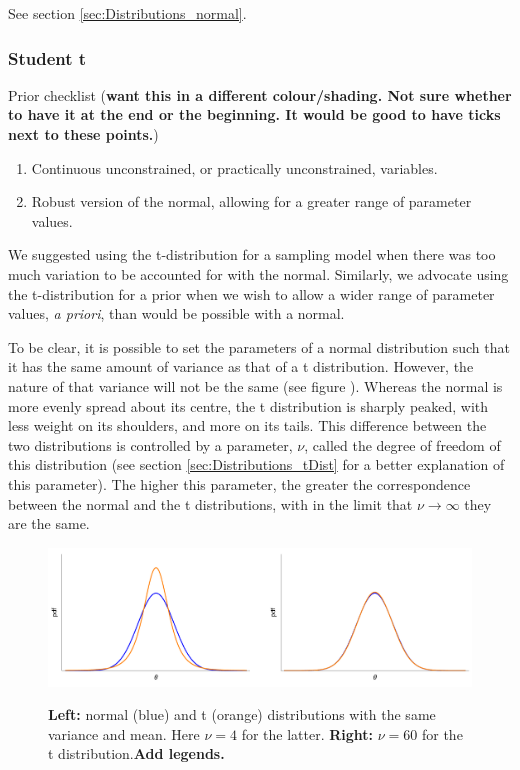 \documentclass[11pt,fullpage]{book}
\begin{document}
See section \ref{sec:Distributions_normal}.



\subsubsection{Student t}
Prior checklist (\textbf{want this in a different colour/shading. Not sure whether to have it at the end or the beginning. It would be good to have ticks next to these points.})

\begin{enumerate} 
\item Continuous unconstrained, or practically unconstrained, variables.
\item Robust version of the normal, allowing for a greater range of parameter values.
\end{enumerate}

We suggested using the t-distribution for a sampling model when there was too much variation to be accounted for with the normal. Similarly, we advocate using the t-distribution for a prior when we wish to allow a wider range of parameter values, \textit{a priori}, than would be possible with a normal.

To be clear, it is possible to set the parameters of a normal distribution such that it has the same amount of variance as that of a t distribution. However, the nature of that variance will not be the same (see figure ). Whereas the normal is more evenly spread about its centre, the t distribution is sharply peaked, with less weight on its shoulders, and more on its tails. This difference between the two distributions is controlled by a parameter, $\nu$, called the degree of freedom of this distribution (see section \ref{sec:Distributions_tDist} for a better explanation of this parameter). The higher this parameter, the greater the correspondence between the normal and the t distributions, with in the limit that $\nu\rightarrow\infty$ they are the same.

\begin{figure}
\centering
\scalebox{0.5} 
{\includegraphics{Distributions_normalTPrior.pdf}}
\caption{\textbf{Left:} normal (blue) and t (orange) distributions with the same variance and mean. Here $\nu=4$ for the latter. \textbf{Right:} $\nu=60$ for the t distribution.\textbf{Add legends.}}\label{fig:Distributions_normalTPrior}
\end{figure}
\end{document}
